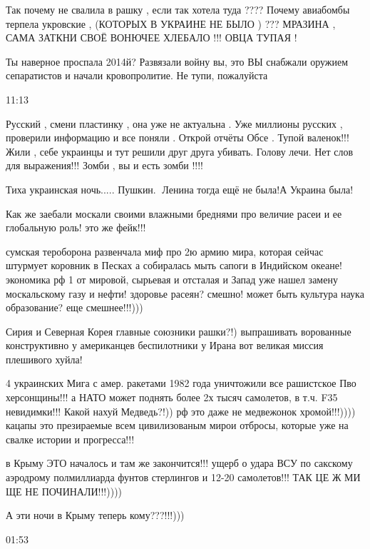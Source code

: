 {Так почему не свалила в рашку , если так хотела туда ???? Почему авиабомбы
терпела укровские , (КОТОРЫХ В УКРАИНЕ НЕ БЫЛО ) ??? МРАЗИНА , САМА ЗАТКНИ СВОЁ
ВОНЮЧЕЕ ХЛЕБАЛО !!! ОВЦА ТУПАЯ !


Ты наверное проспала 2014й? Развязали войну вы, это ВЫ снабжали оружием
сепаратистов и начали кровопролитие. Не тупи, пожалуйста

11:13

Русский , смени пластинку , она уже не актуальна . Уже миллионы русских ,
проверили информацию и все поняли . Открой отчёты Обсе . Тупой валенок!!! Жили
, себе украинцы и тут решили друг друга убивать. Голову лечи. Нет слов для
выражения!!! Зомби , вы и есть зомби !!!!


Тиха украинская ночь..... Пушкин.🤷 Ленина тогда ещё не была!А Украина была!


Как же заебали москали своими влажными бреднями про величие расеи и ее глобальную роль! это же фейк!!!

сумская тероборона развенчала миф про 2ю армию мира, которая сейчас штурмует
коровник в Песках а собиралась мыть сапоги в Индийском океане! экономика рф 1%
от мировой, сырьевая и отсталая и Запад уже нашел замену москальскому газу и
нефти! здоровье расеян? смешно! может быть культура наука образование? еще
смешнее!!!)))

Сирия и Северная Корея главные союзники рашки?!) выпрашивать ворованные
конструктивно у американцев беспилотники у Ирана вот великая миссия плешивого
хуйла!

4 украинских Мига с амер. ракетами 1982 года уничтожили все рашистское Пво
херсонщины!!! а НАТО может поднять более 2х тысяч самолетов, в т.ч. F35
невидимки!!! Какой нахуй Медведь?!)) рф это даже не медвежонок хромой!!!))))
кацапы это презираемые всем цивилизованым мирои отбросы, которые уже на свалке
истории и прогресса!!!

в Крыму ЭТО началось и там же закончится!!! ущерб о удара ВСУ по сакскому
аэродрому полмиллиарда фунтов стерлингов и 12-20 самолетов!!! ТАК ЦЕ Ж МИ ЩЕ НЕ
ПОЧИНАЛИ!!!))))

А эти ночи в Крыму теперь кому???!!!)))

01:53

}
